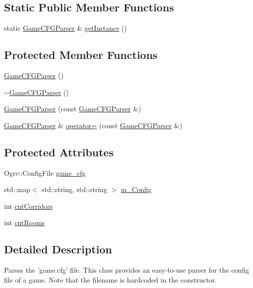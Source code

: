 \subsection*{\-Static \-Public \-Member \-Functions}
\begin{DoxyCompactItemize}
\item 
static \hyperlink{classGameCFGParser}{\-Game\-C\-F\-G\-Parser} \& \hyperlink{classGameCFGParser_a5e16899911e9978520f2b3899f05ca36}{get\-Instance} ()
\end{DoxyCompactItemize}
\subsection*{\-Protected \-Member \-Functions}
\begin{DoxyCompactItemize}
\item 
\hyperlink{classGameCFGParser_ad746b796abbe8e061e3da92e08d3dab7}{\-Game\-C\-F\-G\-Parser} ()
\item 
\hyperlink{classGameCFGParser_a2abbb5569224df6be70644311d524433}{$\sim$\-Game\-C\-F\-G\-Parser} ()
\item 
\hyperlink{classGameCFGParser_a50298175551786f51749010622390163}{\-Game\-C\-F\-G\-Parser} (const \hyperlink{classGameCFGParser}{\-Game\-C\-F\-G\-Parser} \&)
\item 
\hyperlink{classGameCFGParser}{\-Game\-C\-F\-G\-Parser} \& \hyperlink{classGameCFGParser_a8f95dc8cadfc64f785fa929d63339220}{operator=} (const \hyperlink{classGameCFGParser}{\-Game\-C\-F\-G\-Parser} \&)
\end{DoxyCompactItemize}
\subsection*{\-Protected \-Attributes}
\begin{DoxyCompactItemize}
\item 
\-Ogre\-::\-Config\-File \hyperlink{classGameCFGParser_a959aad3003435f1deef6f92ca7902316}{game\-\_\-cfg}
\item 
std\-::map$<$ std\-::string, \*
std\-::string $>$ \hyperlink{classGameCFGParser_a4c61cec38365caa5ed4650eff682ecd9}{m\-\_\-\-Config}
\item 
int \hyperlink{classGameCFGParser_a42c185380b0fb82948ef24fcdbcf1f0f}{cnt\-Corridors}
\item 
int \hyperlink{classGameCFGParser_a026f91734a398714a8e8fae1fa3a4f7f}{cnt\-Rooms}
\end{DoxyCompactItemize}


\subsection{\-Detailed \-Description}
\-Parses the 'game.\-cfg' file. \-This class provides an easy-\/to-\/use parser for the config file of a game. \-Note that the filename is hardcoded in the constructor. 

